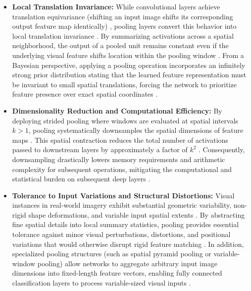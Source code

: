 \begin{itemize}
    \item \textbf{Local Translation Invariance:} While convolutional layers achieve translation equivariance (shifting an input image shifts its corresponding output feature map identically) \parencite{Goodfellow-et-al-2016, nair_relu_2010}, pooling layers convert this behavior into local translation invariance \parencite{Goodfellow-et-al-2016, nair_relu_2010, scherer_evaluation_2010}. By summarizing activations across a spatial neighborhood, the output of a pooled unit remains constant even if the underlying visual feature shifts location within the pooling window \parencite{Goodfellow-et-al-2016, scherer_evaluation_2010}. From a Bayesian perspective, applying a pooling operation incorporates an infinitely strong prior distribution stating that the learned feature representation must be invariant to small spatial translations, forcing the network to prioritize feature presence over exact spatial coordinates \parencite{Goodfellow-et-al-2016}.

    \item \textbf{Dimensionality Reduction and Computational Efficiency:} By deploying strided pooling where windows are evaluated at spatial intervals $k > 1$, pooling systematically downsamples the spatial dimensions of feature maps \parencite{Goodfellow-et-al-2016, lecun_gradient-based_1998}. This spatial contraction reduces the total number of activations passed to downstream layers by approximately a factor of $k^2$ \parencite{Goodfellow-et-al-2016}. Consequently, downsampling drastically lowers memory requirements and arithmetic complexity for subsequent operations, mitigating the computational and statistical burden on subsequent deep layers \parencite{Goodfellow-et-al-2016, lecun_gradient-based_1998}.

    \item \textbf{Tolerance to Input Variations and Structural Distortions:} Visual instances in real-world imagery exhibit substantial geometric variability, non-rigid shape deformations, and variable input spatial extents \parencite{fukushima_neocognitron_1980, Goodfellow-et-al-2016, lecun_gradient-based_1998}. By abstracting fine spatial details into local summary statistics, pooling provides essential tolerance against minor visual perturbations, distortions, and positional variations that would otherwise disrupt rigid feature matching \parencite{fukushima_neocognitron_1980, lecun_gradient-based_1998, scherer_evaluation_2010}. In addition, specialized pooling structures (such as spatial pyramid pooling or variable-window pooling) allow networks to aggregate arbitrary input image dimensions into fixed-length feature vectors, enabling fully connected classification layers to process variable-sized visual inputs \parencite{Goodfellow-et-al-2016, Boureau_CNN_2010}.
\end{itemize}

